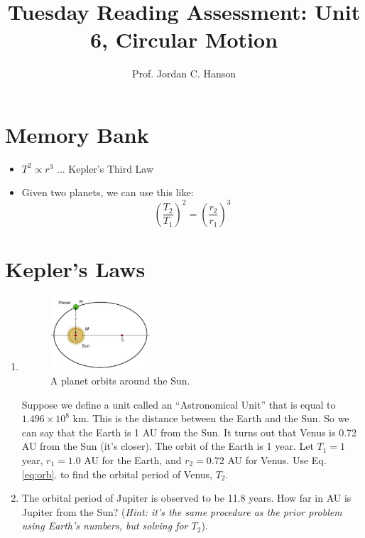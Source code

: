 \documentclass{article}
\begin{document}
\title{Tuesday Reading Assessment: Unit 6, Circular Motion}
\author{Prof. Jordan C. Hanson}

\maketitle

\section{Memory Bank}

\begin{itemize}
\item $T^2 \propto r^3$ ... Kepler's Third Law
\item Given two planets, we can use this like:
\begin{equation}
\left(\frac{T_2}{T_1}\right)^2 = \left(\frac{r_2}{r_1}\right)^3 \label{eq:orb}
\end{equation}
\end{itemize}

\section{Kepler's Laws}

\begin{enumerate}
\item
\begin{figure}[ht]
\centering
\includegraphics[width=0.35\textwidth]{orbit.png}
\caption{\label{fig:orbit} A planet orbits around the Sun.}
\end{figure}
Suppose we define a unit called an ``Astronomical Unit'' that is equal to $1.496\times 10^8$ km.  This is the distance between the Earth and the Sun.  So we can say that the Earth is 1 AU from the Sun.  It turns out that Venus is 0.72 AU from the Sun (it's closer).  The orbit of the Earth is 1 year.  Let $T_1 = 1$ year, $r_1 = 1.0$ AU for the Earth, and $r_2 = 0.72$ AU for Venus.  Use Eq. \ref{eq:orb}. to find the orbital period of Venus, $T_2$. \\ \vspace{3cm}
\item The orbital period of Jupiter is observed to be 11.8 years.  How far in AU is Jupiter from the Sun?  (\textit{Hint: it's the same procedure as the prior problem using Earth's numbers, but solving for $T_2$}).
\end{enumerate}
\end{document}
